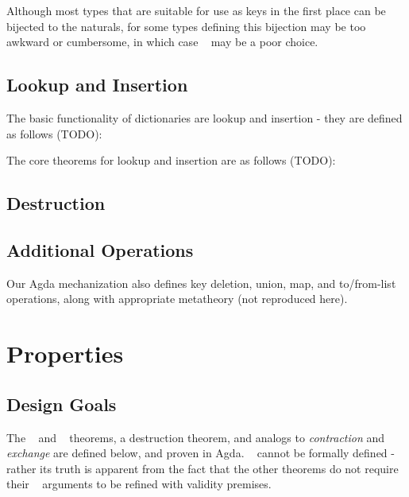 Although most types that are suitable for use as keys in the first place can be bijected to the
naturals, for some types defining this bijection may be too awkward or cumbersome, in which case \dds~ may
be a poor choice.

\subsection{Lookup and Insertion}
\label{sec:DD:basics}
The basic functionality of dictionaries are lookup and insertion - they are defined as follows
(TODO):



The core theorems for lookup and insertion are as follows (TODO):

\subsection{Destruction}


\subsection{Additional Operations}

Our Agda mechanization also defines key deletion, union, map, and to/from-list operations, along
with appropriate metatheory (not reproduced here).



\section{Properties}
\label{sec:DD:props}

\subsection{Design Goals}

The \SemInj~ and \EqDec~ theorems, a destruction theorem, and analogs to \emph{contraction} and
\emph{exchange} are defined below, and proven in Agda. \SemTot~ cannot be formally defined - rather
its truth is apparent from the fact that the other theorems do not require their \dd~ arguments to
be refined with validity premises.

